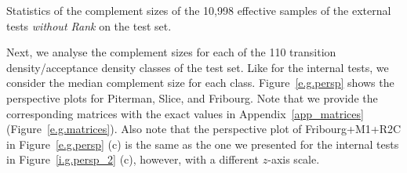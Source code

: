 \begin{table}[ht]
\centering

\caption{Statistics of the complement sizes of the 10,998 effective samples of the external tests \textit{without Rank} on the \goal{} test set.}
\label{e.g.stats}
\end{table}

Next, we analyse the complement sizes for each of the 110 transition density/acceptance density classes of the \goal{} test set. Like for the internal tests, we consider the median complement size for each class. Figure~\ref{e.g.persp} shows the perspective plots for Piterman, Slice, and Fribourg. Note that we provide the corresponding matrices with the exact values in Appendix~\ref{app_matrices} (Figure~\ref{e.g.matrices}). Also note that the perspective plot of Fribourg+M1+R2C in Figure~\ref{e.g.persp} (c) is the same as the one we presented for the internal tests in Figure~\ref{i.g.persp_2} (c), however, with a different $z$-axis scale.

